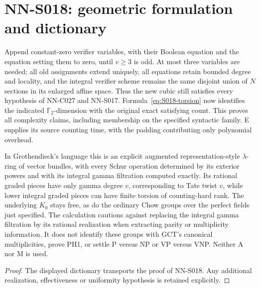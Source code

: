 \section{NN-S018: geometric formulation and dictionary}
\begin{geometricstatement}[NN-S018]
Append constant-zero verifier variables, with their Boolean equation
and the equation setting them to zero, until $v\ge3$ is odd.
At most three variables are needed; all old assignments extend
uniquely, all equations retain bounded degree and locality, and
the integral verifier scheme remains the same disjoint union of
$N$ sections in its enlarged affine space. Thus the new cubic
still satisfies every hypothesis of NN-C027 and NN-S017.
Formula~\eqref{eq:S018-torsion} now identifies the indicated
$\mathbb F_2$-dimension with the original exact satisfying count.
This proves all complexity claims, including membership on the
specified syntactic family. E supplies its source counting time,
with the padding contributing only polynomial overhead.

In Grothendieck's language this is an explicit augmented
representation-style $\lambda$-ring of vector bundles, with every
Schur operation determined by its exterior powers and with its
integral gamma filtration computed exactly. Its rational graded
pieces have only gamma degree $v$, corresponding to Tate twist
$v$, while lower
integral graded pieces can have finite torsion of counting-hard
rank. The underlying $K_0$ stays free, as do the ordinary Chow groups
over the perfect fields just specified.
The calculation cautions against replacing the integral gamma
filtration by its rational realization when extracting parity
or multiplicity information. It does not identify these groups
with GCT's canonical multiplicities, prove PH1, or settle P versus
NP or VP versus VNP. Neither A nor M is used.
\end{geometricstatement}
\begin{proof} The displayed dictionary transports the proof of NN-S018. Any additional realization, effectiveness or uniformity hypothesis is retained explicitly.\end{proof}


